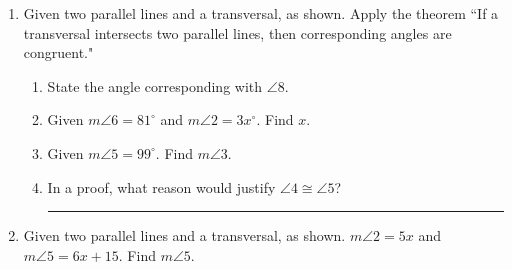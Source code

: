 \documentclass[12pt, oneside]{article}
\begin{document}
  \begin{enumerate}
    \item Given two parallel lines and a transversal, as shown. Apply the theorem ``If a transversal intersects two parallel lines, then corresponding angles are congruent."
      \begin{center}
      \end{center}
      \begin{enumerate}
        \item State the angle corresponding with $\angle 8$. \bigskip
        \item Given $m\angle 6 = 81^\circ$ and $m\angle 2 = 3x^\circ$. Find $x$. \bigskip
        \item Given $m\angle 5 = 99^\circ$. Find $m\angle 3$. \bigskip
        \item In a proof, what reason would justify $\angle 4 \cong \angle 5$? \rule{6cm}{0.15mm}
      \end{enumerate}

    \item Given two parallel lines and a transversal, as shown. $m\angle 2=5x$ and $m\angle 5=6x+15$. Find $m\angle 5$.
        \begin{center}
        \end{center}


\end{enumerate}
\end{document}
